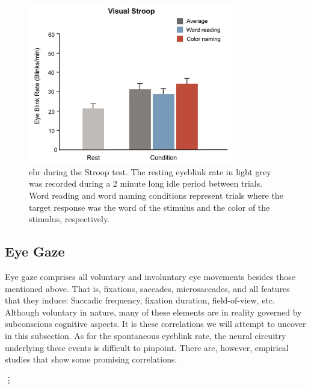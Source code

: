 \begin{figure}[h]
    \centering
    \includegraphics[width=0.8\textwidth]{figures/bt_oh2012B.png}
    \caption{\acrfull{ebr} during the Stroop test. The resting eyeblink rate in light grey was recorded during a 2 minute long idle period between trials. Word reading and word naming conditions represent trials where the target response was the word of the stimulus and the color of the stimulus, respectively.}
    \label{fig:bt_oh2012B}
\end{figure}

\subsection{Eye Gaze}

Eye gaze comprises all voluntary and involuntary eye movements besides those mentioned above. That is, fixations, saccades, microsaccades, and all features that they induce: Saccadic frequency, fixation duration, field-of-view, etc. Although voluntary in nature, many of these elements are in reality governed by subconscious cognitive aspects. It is these correlations we will attempt to uncover in this subsection. As for the spontaneous eyeblink rate, the neural circuitry underlying these events is difficult to pinpoint. There are, however, empirical studies that show some promising correlations.



\vdots

\FloatBarrier
